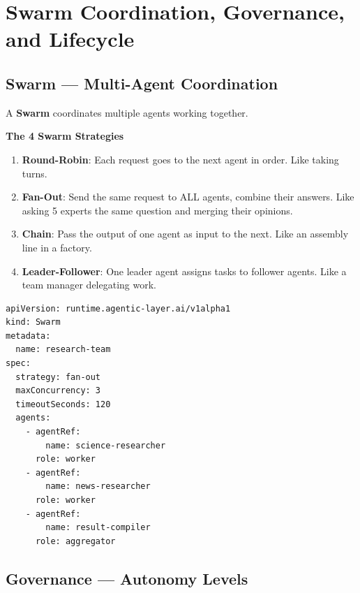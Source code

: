 \documentclass[12pt,a4paper,openany]{report}
\begin{document}
\chapter{Swarm Coordination, Governance, and Lifecycle}

\section{Swarm — Multi-Agent Coordination}

A \textbf{Swarm} coordinates multiple agents working together.

\begin{keyconceptbox}
\textbf{The 4 Swarm Strategies}

\begin{enumerate}
    \item \textbf{Round-Robin}: Each request goes to the next agent in order. Like taking turns.
    \item \textbf{Fan-Out}: Send the same request to ALL agents, combine their answers. Like asking 5 experts the same question and merging their opinions.
    \item \textbf{Chain}: Pass the output of one agent as input to the next. Like an assembly line in a factory.
    \item \textbf{Leader-Follower}: One leader agent assigns tasks to follower agents. Like a team manager delegating work.
\end{enumerate}
\end{keyconceptbox}

\begin{lstlisting}[style=yaml, caption={A fan-out swarm with 3 agents}]
apiVersion: runtime.agentic-layer.ai/v1alpha1
kind: Swarm
metadata:
  name: research-team
spec:
  strategy: fan-out
  maxConcurrency: 3
  timeoutSeconds: 120
  agents:
    - agentRef:
        name: science-researcher
      role: worker
    - agentRef:
        name: news-researcher
      role: worker
    - agentRef:
        name: result-compiler
      role: aggregator
\end{lstlisting}

\section{Governance — Autonomy Levels}
\end{document}
